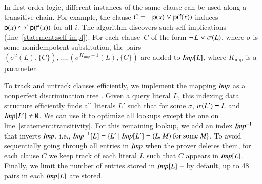 In first-order logic, different instances of the same clause can
be used along a transitive chain. For example, the clause $C =
\negpredlit{\cst{p}(x)} \cor \pospredlit{\cst{p}(\cst{f}(x))}$ induces $\cst{p}(x) \bigfimpl{M}^i \cst{p}(\cst{f}^i(x))$ for all $i$.
The algorithm discovers such self-implications (line~\ref{statement:self-impl}): For
each clause~$C$ of the form $\neglit{L} \cor \sigma(L)$, where $\sigma$ is
some nonidempotent substitution, the pairs $(\sigma^2(L), \{C\}),\allowbreak
\ldots,\allowbreak (\sigma^{K_{\mathrm{imp}} + 1}(L), \{C\})$ are added to
$\impmap[L]$, where $K_{\mathrm{imp}}$ is a parameter. 

\newcommand{\concl}{\ensuremath{\impmap^{-1}}}

To track and untrack clauses efficiently, we implement the mapping $\impmap$ as a
nonperfect discrimination tree \cite{rsv-2001-term-indexing}. Given a query
literal $L$, this indexing data structure efficiently finds all literals $L'$ such that
for some $\sigma$, $\sigmaterm{L'} = L$ and $\impmap[L'] \not= \emptyset$. We can use
it to optimize all lookups except the one on line~\ref{statement:transitivity}.
For this remaining lookup, we add an
index \concl{} that inverts $\impmap$, i.e., $\concl[L] = \{ L' \mid
\impmap[L'] = (L,M) \text{ for some } M \}$. To avoid sequentially going through
all entries in $\impmap$ when the prover deletes them, for each clause $C$
we keep track of each literal $L$ such that $C$ appears in $\impmap[L]$.
Finally, we limit the number of entries stored in $\impmap[L]$ -- by default,
up to 48 pairs in each $\impmap[L]$ are stored.

